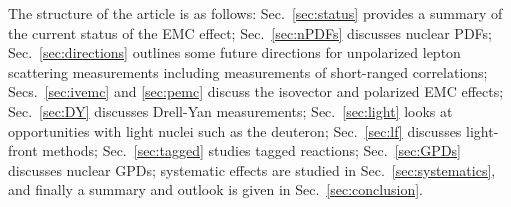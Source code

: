 The structure of the article is as follows: Sec.~\ref{sec:status} provides a summary of the current status of the EMC effect; Sec.~\ref{sec:nPDFs} discusses nuclear PDFs; Sec.~\ref{sec:directions} outlines some future directions for unpolarized lepton scattering measurements including measurements of short-ranged correlations; Secs.~\ref{sec:ivemc} and \ref{sec:pemc} discuss the isovector and polarized EMC effects; Sec.~\ref{sec:DY} discusses Drell-Yan measurements; Sec.~\ref{sec:light} looks at opportunities with light nuclei such as the deuteron; Sec.~\ref{sec:lf} discusses light-front methods; Sec.~\ref{sec:tagged} studies tagged reactions; Sec.~\ref{sec:GPDs} discusses nuclear GPDs; systematic effects are studied in Sec.~\ref{sec:systematics}, and finally a summary and outlook is given in Sec.~\ref{sec:conclusion}.

